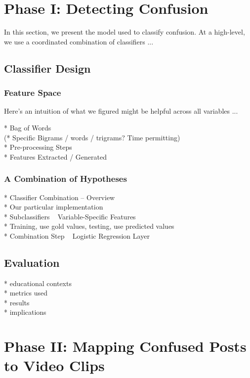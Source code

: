 \documentclass{edm_template}
\begin{document}
\section{Phase I: Detecting Confusion}
In this section, we present the model used to classify confusion. At a high-level, we use a coordinated combination of classifiers ...

\subsection{Classifier Design}
\subsubsection{Feature Space}
Here's an intuition of what we figured might be helpful across all variables ...

* Bag of Words \\
(* Specific Bigrams / words / trigrams? Time permitting) \\
* Pre-processing Steps \\
* Features Extracted / Generated \\

\subsubsection{A Combination of Hypotheses}
* Classifier Combination -- Overview \\
* Our particular implementation \\
* Subclassifiers ~ Variable-Specific Features \\
* Training, use gold values, testing, use predicted values \\
* Combination Step ~ Logistic Regression Layer \\

\subsection{Evaluation}

* educational contexts \\
* metrics used \\ 
* results \\
* implications \\

\section{Phase II: Mapping Confused Posts to Video Clips}
\end{document}
